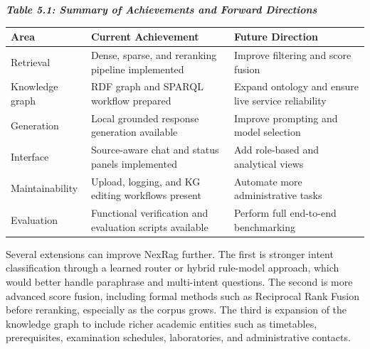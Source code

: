 \begin{center}
\normalsize \textbf{\textit{Table 5.1: Summary of Achievements and Forward Directions}}
\end{center}

\begingroup
\footnotesize
\renewcommand{\arraystretch}{1.12}
\setlength{\tabcolsep}{4pt}
\begin{table}[H]
\centering
\label{tab:conclusion-summary}
\begin{tabularx}{\textwidth}{|>{\RaggedRight\arraybackslash\hspace{0pt}}X|>{\RaggedRight\arraybackslash\hspace{0pt}}X|>{\RaggedRight\arraybackslash\hspace{0pt}}X|}
\hline
\textbf{Area} & \textbf{Current Achievement} & \textbf{Future Direction} \\ \hline
Retrieval & Dense, sparse, and reranking pipeline implemented & Improve filtering and score fusion \\ \hline
Knowledge graph & RDF graph and SPARQL workflow prepared & Expand ontology and ensure live service reliability \\ \hline
Generation & Local grounded response generation available & Improve prompting and model selection \\ \hline
Interface & Source-aware chat and status panels implemented & Add role-based and analytical views \\ \hline
Maintainability & Upload, logging, and KG editing workflows present & Automate more administrative tasks \\ \hline
Evaluation & Functional verification and evaluation scripts available & Perform full end-to-end benchmarking \\ \hline
\end{tabularx}
\end{table}
\endgroup

\label{sec:conclusion-future-scope}

Several extensions can improve NexRag further. The first is stronger intent classification through a learned router or hybrid rule-model approach, which would better handle paraphrase and multi-intent questions. The second is more advanced score fusion, including formal methods such as Reciprocal Rank Fusion before reranking, especially as the corpus grows. The third is expansion of the knowledge graph to include richer academic entities such as timetables, prerequisites, examination schedules, laboratories, and administrative contacts.

